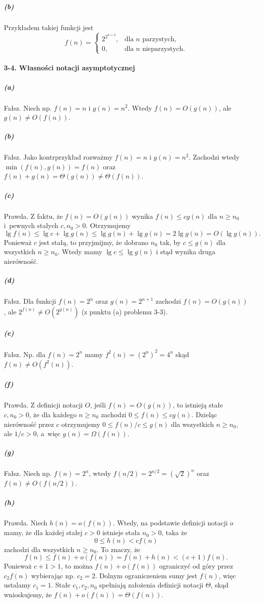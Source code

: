 \subparagraph{(b)}
Przykładem takiej funkcji jest
\[
  f(n)=\left\{\begin{array}{ll}
	2^{2^{n+2}}, & \mbox{dla }n\mbox{ parzystych,} \\
	0, & \mbox{dla }n\mbox{ nieparzystych}.
  \end{array}\right.
\]

\paragraph{3-4. Własności notacji asymptotycznej}

\subparagraph{(a)}
Fałsz. Niech np. $f(n)=n$ i $g(n)=n^2$. Wtedy $f(n)=O(g(n))$, ale $g(n)\ne O(f(n))$.

\subparagraph{(b)}
Fałsz. Jako kontrprzykład rozważmy $f(n)=n$ i $g(n)=n^2$. Zachodzi wtedy $\min(f(n),g(n))=f(n)$ oraz $f(n)+g(n)=\Theta(g(n))\ne\Theta(f(n))$.

\subparagraph{(c)}
Prawda. Z faktu, że $f(n)=O(g(n))$ wynika $f(n)\le cg(n)$ dla $n\ge n_0$ i~pewnych stałych $c,n_0>0$. Otrzymujemy
\[
  \lg f(n)\le\lg c+\lg g(n)\le \lg g(n)+\lg g(n) = 2\lg g(n) = O(\lg g(n)).
\]
Ponieważ $c$ jest stałą, to przyjmijmy, że dobrano $n_0$ tak, by $c\le g(n)$ dla wszystkich $n\ge n_0$. Wtedy mamy $\lg c\le\lg g(n)$ i stąd wynika druga nierówność.

\subparagraph{(d)}
Fałsz. Dla funkcji $f(n)=2^n$ oraz $g(n)=2^{n+1}$ zachodzi $f(n)=O(g(n))$, ale $2^{f(n)}\ne O\left(2^{g(n)}\right)$ (z punktu (a) problemu 3-3).

\subparagraph{(e)}
Fałsz. Np. dla $f(n)=2^n$ mamy $f^2(n)=(2^n)^2=4^n$ skąd $f(n)\ne O\left(f^2(n)\right)$.

\subparagraph{(f)}
Prawda. Z definicji notacji $O$, jeśli $f(n)=O(g(n))$, to istnieją stałe $c,n_0>0$, że dla każdego $n\ge n_0$ zachodzi $0\le f(n)\le cg(n)$. Dzieląc nierówność przez $c$ otrzymujemy $0\le f(n)/c\le g(n)$ dla wszystkich $n\ge n_0$, ale $1/c>0$, a~więc $g(n)=\Omega(f(n))$.

\subparagraph{(g)}
Fałsz. Niech np. $f(n)=2^n$, wtedy $f(n/2)=2^{n/2}=\left(\sqrt{2}\right)^n$ oraz $f(n)\ne O(f(n/2))$.

\subparagraph{(h)}
Prawda. Niech $h(n)=o(f(n))$. Wtedy, na podstawie definicji notacji $o$ mamy, że dla każdej stałej $c>0$ istnieje stała $n_0>0$, taka że
\[
  0\le h(n)<cf(n)
\]
zachodzi dla wszystkich $n\ge n_0$. To znaczy, że
\[
  f(n)\le f(n)+o(f(n))=f(n)+h(n)<(c+1)f(n).
\]
Ponieważ $c+1>1$, to można $f(n)+o(f(n))$ ograniczyć od góry przez $c_2f(n)$ wybierając np. $c_2=2$. Dolnym ograniczeniem sumy jest $f(n)$, więc ustalamy $c_1=1$. Stałe $c_1,c_2,n_0$ spełniają założenia definicji notacji $\Theta$, skąd wnioskujemy, że $f(n)+o(f(n))=\Theta(f(n))$.

